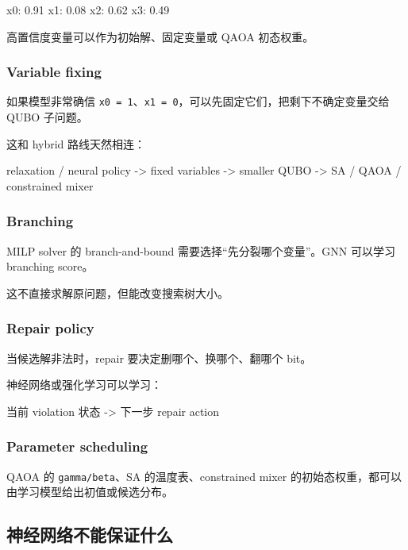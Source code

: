 \documentclass[UTF8,12pt,a4paper]{ctexart}
\begin{document}
\begin{GuideVerbatim}
x0: 0.91
x1: 0.08
x2: 0.62
x3: 0.49
\end{GuideVerbatim}

高置信度变量可以作为初始解、固定变量或 QAOA 初态权重。

\subsubsection*{Variable fixing}

如果模型非常确信 \texttt{x0 = 1}、\texttt{x1 = 0}，可以先固定它们，把剩下不确定变量交给 QUBO 子问题。

这和 hybrid 路线天然相连：

\begin{GuideVerbatim}
relaxation / neural policy
  -> fixed variables
  -> smaller QUBO
  -> SA / QAOA / constrained mixer
\end{GuideVerbatim}

\subsubsection*{Branching}

MILP solver 的 branch-and-bound 需要选择“先分裂哪个变量”。GNN 可以学习 branching score。

这不直接求解原问题，但能改变搜索树大小。

\subsubsection*{Repair policy}

当候选解非法时，repair 要决定删哪个、换哪个、翻哪个 bit。

神经网络或强化学习可以学习：

\begin{GuideVerbatim}
当前 violation 状态 -> 下一步 repair action
\end{GuideVerbatim}

\subsubsection*{Parameter scheduling}

QAOA 的 \texttt{gamma/beta}、SA 的温度表、constrained mixer 的初始态权重，都可以由学习模型给出初值或候选分布。

\subsection*{神经网络不能保证什么}
\end{document}
